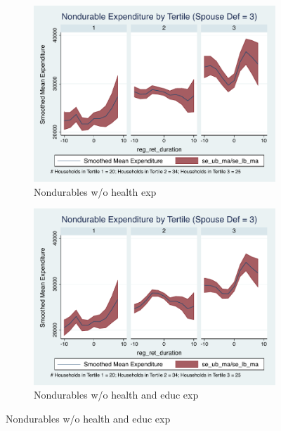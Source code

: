 \documentclass[11pt,onecolumn]{article}
\numberwithin{figure}{section}
\begin{document}
\begin{figure}
  \begin{subfigure}{0.5\textwidth}
  \centering
 	\includegraphics[width=0.9\linewidth]{../ConsumptionPostRetirement_by_SpouseDef/Smoothed_xhealth/spouse_def_3.pdf}
    \caption{Nondurables w/o health exp}
    \label{fig:chapter001_dist_001}
  \end{subfigure}
  	\hspace{1cm}
  \begin{subfigure}{0.5\textwidth}
 	\includegraphics[width=0.9\linewidth]{../ConsumptionPostRetirement_by_SpouseDef/Smoothed_xhealth_educ/spouse_def_3.pdf}
    \caption{Nondurables w/o health and educ exp}
    \label{fig:chapter001_reward_001}
  \end{subfigure}
\end{figure}
\clearpage
\end{document}
